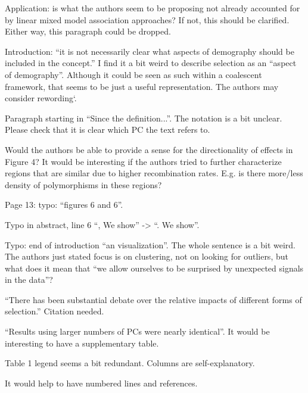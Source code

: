 \begin{point}{Application:}
 is what the authors seem to be proposing not already accounted for by linear
mixed model association approaches? If not, this should be clarified. Either way, this paragraph
could be dropped.
\end{point}

\begin{point}{Introduction:}
 ``it is not necessarily clear what aspects of demography should be included in the
concept.'' I find it a bit weird to describe selection as an ``aspect of demography''. Although it
could be seen as such within a coalescent framework, that seems to be just a useful
representation. The authors may consider rewording`.
\end{point}

\begin{point}{}
Paragraph starting in ``Since the definition...''. The notation is a bit unclear. Please check that it
is clear which PC the text refers to.
\end{point}

\begin{point}{}
Would the authors be able to provide a sense for the directionality of effects in Figure 4? It
would be interesting if the authors tried to further characterize regions that are similar due to
higher recombination rates. E.g. is there more/less density of polymorphisms in these regions?
\end{point}

\begin{point}{Page 13:}
typo: ``figures 6 and 6''.
\end{point}

\begin{point}{}
Typo in abstract, line 6 ``, We show'' -> ``. We show''.
\end{point}

\begin{point}{}
Typo: end of introduction ``an visualization''. The whole sentence is a bit weird. The authors just
stated focus is on clustering, not on looking for outliers, but what does it mean that ``we allow
ourselves to be surprised by unexpected signals in the data''?
\end{point}

\begin{point}{}
``There has been substantial debate over the relative impacts of different forms of selection.''
Citation needed.
\end{point}

\begin{point}{}
``Results using larger numbers of PCs were nearly identical''. It would be interesting to have a
supplementary table.
\end{point}

\begin{point}{}
Table 1 legend seems a bit redundant. Columns are self-explanatory.
\end{point}

\begin{point}{}
It would help to have numbered lines and references.
\end{point}

